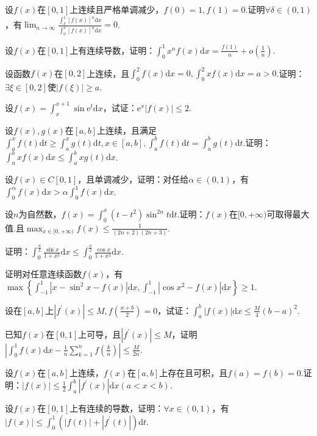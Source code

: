 \begin{xiti}
\item 设$f(x)$在$[0,1]$上连续且严格单调减少，$f(0)=1,f(1)=0$.证明$\forall \delta \in(0,1)$，有$\lim _{n \rightarrow \infty} \frac{\int_{\delta}^{1}[f(x)]^{n} \mathrm{d} x}{\int_{0}^{\delta}[f(x)]^{n} \mathrm{d} x}=0$.
\item 设$f(x)$在$[0,1]$上有连续导数，证明：$\int_{0}^{1} x^{n} f(x) \mathrm{d} x=\frac{f(1)}{n}+o\left(\frac{1}{n}\right)$.
\item 设函数$f(x)$在$[0,2]$上连续，且$\int_{0}^{2} f(x) \mathrm{d} x=0, \int_{0}^{2} x f(x) \mathrm{d} x=a>0$.证明：$\exists \xi \in[0,2]$使$|f(\xi)| \geqslant a$.
\item 设$f(x)=\int_{x}^{x+1} \sin \mathrm{e}^{t} \mathrm{d} x$，试证：$\mathrm{e}^{x}|f(x)| \leqslant 2$.
\item 设$f(x),g(x)$在$[a,b]$上连续，且满足$\int_{a}^{x} f(t) \mathrm{d} t \geqslant \int_{a}^{x} g(t) \mathrm{d} t, x \in[a, b], \int_{a}^{b} f(t) \mathrm{d} t=\int_{a}^{b} g(t) \mathrm{d} t$.证明：$\int_{a}^{b} x f(x) \mathrm{d} x \leqslant \int_{a}^{b} x g(t) \mathrm{d} x$.
\item 设$f(x) \in C[0,1]$，且单调减少，证明：对任给$\alpha\in (0,1)$，有$\int_{0}^{\alpha} f(x) \mathrm{d} x>\alpha \int_{0}^{1} f(x) \mathrm{d} x$.
\item 设$n$为自然数，$f(x)=\int_{0}^{x}\left(t-t^{2}\right) \sin ^{2 n} t \mathrm{d} t$.证明：$f(x)$在$[0,+\infty)$可取得最大值.且$\max _{x \in[0,+\infty)} f(x) \leqslant \frac{1}{(2 n+2)(2 n+3)}$.
\item 证明：$\int_{0}^{\frac{\pi}{2}} \frac{\sin x}{1+x^{2}} \mathrm{d} x \leqslant \int_{0}^{\frac{\pi}{2}} \frac{\cos x}{1+x^{2}} \mathrm{d} x$.
\item 证明对任意连续函数$f(x)$，有$\max \left\{\int_{-1}^{1}\left|x-\sin ^{2} x-f(x)\right| \mathrm{d} x, \int_{-1}^{1}\left|\cos x^{2}-f(x)\right| \mathrm{d} x\right\} \geqslant 1$.
\item 设在$[a,b]$上$\left|f^{\prime}(x)\right| \leqslant M, f\left(\frac{a+b}{2}\right)=0$，试证：$\int_{a}^{b}|f(x)| \mathrm{d} x \leqslant \frac{M}{4}(b-a)^{2}$.
\item 已知$f(x)$在$[0,1]$上可导，且$\left|f^{\prime}(x)\right| \leqslant M$，证明$\left|\int_{0}^{1} f(x) \mathrm{d} x-\frac{1}{n} \sum_{k=1}^{n} f\left(\frac{k}{n}\right)\right| \leqslant \frac{M}{2 n}$.
\item 设$f(x)$在$[a,b]$上连续，$f(x)$在$[a,b]$上存在且可积，且$f(a)=f(b)=0$.证明：$|f(x)| \leqslant \frac{1}{2} \int_{a}^{b}\left|f^{\prime}(x)\right| \mathrm{d} x(a<x<b)$.
\item 设$f(x)$在$[0,1]$上有连续的导数，证明：$\forall x\in(0,1)$，有$|f(x)| \leqslant \int_{0}^{1}\left(|f(t)|+\left|f^{\prime}(t)\right|\right) \mathrm{d} t$.

\end{xiti}
